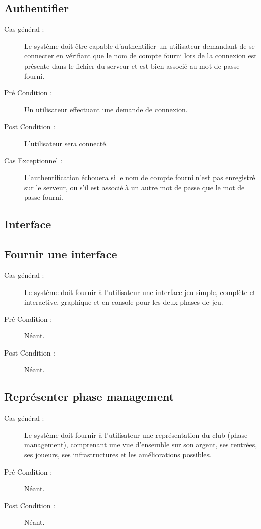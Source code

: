 \documentclass[a4paper]{report}
\begin{document}
\subsection{Authentifier}
\begin{description}
    \item[Cas général :] Le système doit être capable d'authentifier un \gls{utilisateur} demandant de se connecter en vérifiant que le nom de compte fourni lors de la connexion est présente dans le fichier du \gls{serveur} et est bien associé au mot de passe fourni.
    \item[Pré Condition  :] Un \gls{utilisateur} effectuant une demande de connexion.
    \item[Post Condition :] L'\gls{utilisateur} sera connecté.
    \item[Cas Exceptionnel :] L'authentification échouera si le nom de compte fourni n'est pas enregistré sur le \gls{serveur}, ou s'il est associé à un autre mot de passe que le mot de passe fourni.
\end{description}

\subsection{Interface}
\subsection{Fournir une interface}
\begin{description}
    \item[Cas général :] Le système doit fournir à l'\gls{utilisateur} une interface jeu simple, complète et interactive, graphique et en console pour les deux phases de jeu.
    \item[Pré Condition  :] Néant.
    \item[Post Condition :] Néant.
\end{description}

\subsection{Représenter phase management}
\begin{description}
    \item[Cas général :] Le système doit fournir à l'\gls{utilisateur} une représentation du \gls{club} (phase management), comprenant une vue d'ensemble sur son argent, ses rentrées, ses \glspl{joueur}, ses infrastructures et les améliorations possibles.
    \item[Pré Condition  :] Néant.
    \item[Post Condition :] Néant.
\end{description}
\end{document}

